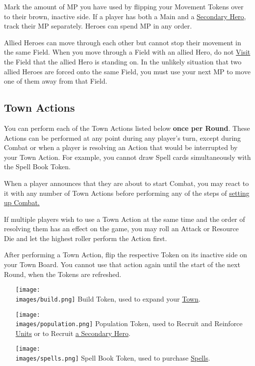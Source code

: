 \begin{multicols*}{2}
\bigskip

Mark the amount of MP you have used by flipping your Movement Tokens over to their brown, inactive side.
If a player has both a Main and a \hyperlink{Secondary}{Secondary Hero}, track their MP separately.
Heroes can spend MP in any order.\par
Allied Heroes can move through each other but cannot stop their movement in the same Field.
When you move through a Field with an allied Hero, do not \hyperlink{Categories}{Visit} the Field that the allied Hero is standing on.
In the unlikely situation that two allied Heroes are forced onto the same Field, you must use your next MP to move one of them away from that Field.\par
{}

\subsection*{Town Actions}
You can perform each of the Town Actions listed below \textbf{once per Round}.
These Actions can be performed at any point during any player's turn, except during Combat or when a player is resolving an Action that would be interrupted by your Town Action.
For example, you cannot draw Spell cards simultaneously with the Spell Book Token.\par
When a player announces that they are about to start Combat, you may react to it with any number of Town Actions before performing any of the steps of \hyperlink{Combatsetup}{setting up Combat.}\par
If multiple players wish to use a Town Action at the same time and the order of resolving them has an effect on the game, you may roll an Attack or Resource Die and let the highest roller perform the Action first.\par
After performing a Town Action, flip the respective Token on its inactive side on your Town Board.
You cannot use that action again until the start of the next Round, when the Tokens are refreshed.
\begin{itemize}
  \item [{\texttt{[image: \\images/build.png]}}] Build Token, used to expand your \hyperlink{Town}{Town}.
  \item [{\texttt{[image: \\images/population.png]}}] Population Token, used to Recruit and Reinforce \hyperlink{Units}{Units} or to Recruit \hyperlink{Secondary}{a Secondary Hero}.
  \item [{\texttt{[image: \\images/spells.png]}}]Spell Book Token, used to purchase \hyperlink{spells}{Spells}.
\end{itemize}


\end{multicols*}

